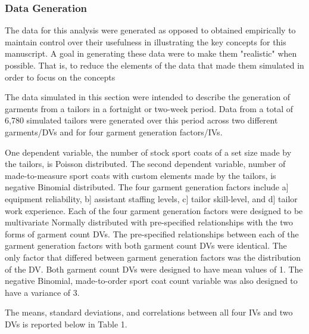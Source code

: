 \documentclass[ShortAfour,times,sageapa]{sagej}
\begin{document}
		\subsubsection{Data Generation}
		
	The data for this analysis were generated as opposed to obtained empirically to maintain control over their usefulness in illustrating the key concepts for this manuscript.
	A goal in generating these data were to make them "realistic" when possible. 
	That is, to reduce the elements of the data that made them simulated in order to focus on the concepts
	
	The data simulated in this section were intended to describe the generation of garments from a tailors in a fortnight or two-week period.
	Data from a total of 6,780 simulated tailors were generated over this period across two different garments/DVs and for four garment generation factors/IVs.
	
	One dependent variable, the number of stock sport coats of a set size made by the tailors, is Poisson distributed. 
	The second dependent variable, number of made-to-measure sport coats with custom elements made by the tailors, is negative Binomial distributed. 
	The four garment generation factors include a] equipment reliability, b] assistant staffing levels, c] tailor skill-level, and d] tailor work experience.
	Each of the four garment generation factors were designed to be multivariate Normally distributed with pre-specified relationships with the two forms of garment count DVs.
	The pre-specified relationships between each of the garment generation factors with both garment count DVs were identical.
	The only factor that differed between garment generation factors was the distribution of the DV.
	Both garment count DVs were designed to have mean values of 1.
	The negative Binomial, made-to-order sport coat count variable was also designed to have a variance of 3.	
	
	The means, standard deviations, and correlations between all four IVs and two DVs is reported below in Table 1. 
	
\end{document}
